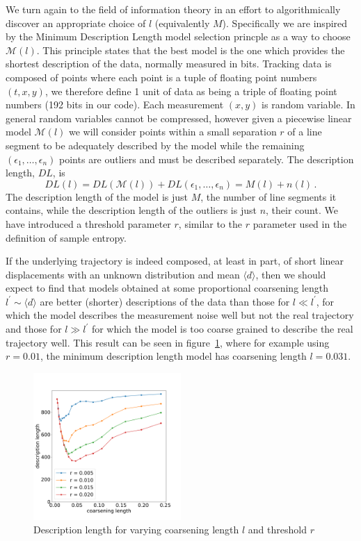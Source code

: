 \documentclass{article}
\newcommand{\mean}[1]{\langle{#1}\rangle}
\begin{document}
We turn again to the field of information theory in an effort to algorithmically discover 
an appropriate choice of $l$ (equivalently $M$). Specifically we are inspired by
the Minimum Description Length model selection princple 
as a way to choose $\mathcal{M}(l)$. This principle states that
the best model is the one which provides the shortest description of the data,
normally measured in bits.
Tracking data is composed of points where each point is a tuple of floating point numbers $(t,x,y)$,
we therefore define 1 unit of data as being a triple of floating point numbers (192 bits in our code).
Each measurement $(x,y)$ is random variable. In general random variables cannot be compressed,
however given a piecewise linear model $\mathcal{M}(l)$ we will consider points 
within a small separation $r$ of a line segment to be adequately described by the model
while the remaining $(\epsilon_1,\ldots,\epsilon_n)$ points are outliers and must be described separately.
The description length, $DL$, is
\begin{equation}
    DL(l) = DL(\mathcal{M}(l)) + DL(\epsilon_1,\ldots,\epsilon_n) = M(l) + n(l) \, . 
\end{equation}
The description length of the model is just $M$, the number of line segments it contains,
while the description length of the outliers is just $n$, their count. 
We have introduced a threshold parameter $r$, similar to the $r$ parameter used in the 
definition of sample entropy.

If the underlying trajectory is indeed composed, at least in part, of short linear displacements
with an unknown distribution and mean $\mean{d}$,
then we should expect to find that models obtained at some proportional coarsening length $l^\prime \sim \mean{d}$
are better (shorter) descriptions of the data than those for $l \ll l^\prime$, for which the model describes 
the measurement noise well but not the real trajectory and those for $l \gg l^\prime$ for which the model 
is too coarse grained to describe the real trajectory well. This result can be seen in figure~\ref{fig:description_length},
where for example using $r=0.01$, the minimum description length model has coarsening length $l = 0.031$.


\begin{figure}[h]
    \centering
    \includegraphics[width=0.5\textwidth]{description_length.png}
    \caption{Description length for varying coarsening length $l$ and threshold $r$
    }
    \label{fig:description_length}
\end{figure}
\end{document}
